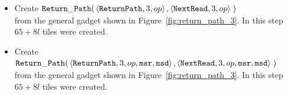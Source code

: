 \begin{itemize}
    \item Create
    $\begin{aligned}[t]
        {\tt Return\_Path}(& \left\langle {\tt ReturnPath},  3, op \right\rangle,
                      \left\langle {\tt NextRead},    3, op \right\rangle \;)
    \end{aligned}$\\from the general gadget shown in Figure~\ref{fig:return_path_3}. In this step $65 + 8l$ tiles were created.


    \item Create
    $\begin{aligned}[t]
        {\tt Return\_Path}(& \left\langle {\tt ReturnPath}, 3, op, {\tt msr}, {\tt msd} \right\rangle,
                      \left\langle {\tt NextRead},   3, op, {\tt msr}, {\tt msd} \right\rangle \;)
    \end{aligned}$\\from the general gadget shown in Figure~\ref{fig:return_path_3}. In this step $65 + 8l$ tiles were created.

\end{itemize}

